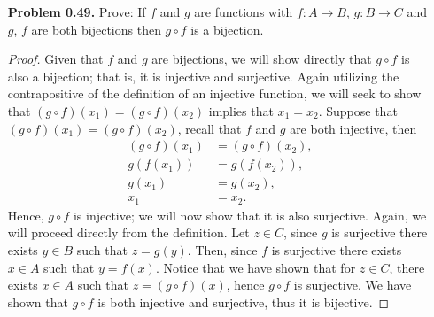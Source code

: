 \documentclass{amsart}
\begin{document}
\begin{enumerate}
		\item[\textbf{Problem 0.49.}] Prove: If $f$ and $g$ are functions with $f: A \to B$, $g: B \to C$ and $g$, $f$ are both bijections then $g \circ f$ is a bijection.
		\begin{proof} Given that $f$ and $g$ are bijections, we will show directly that $g \circ f$ is also a bijection; that is, it is injective and surjective. 
		Again utilizing the contrapositive of the definition of an injective function, we will seek to show that $(g \circ f)(x_{1}) = (g \circ f)(x_{2})$ implies that $x_{1} = x_{2}$. 
		Suppose that $(g \circ f)(x_{1}) = (g \circ f)(x_{2})$, recall that $f$ and $g$ are both injective, then
			\begin{align*}
				(g \circ f)(x_{1}) &= (g \circ f)(x_{2}), \\
				g\left( f(x_{1}) \right) &= g\left( f(x_{2}) \right), \\
				g(x_{1}) &= g(x_{2}), \\
				x_{1} &= x_{2}.
			\end{align*}
		Hence, $g \circ f$ is injective; we will now show that it is also surjective. 
		Again, we will proceed directly from the definition. 
		Let $z \in C$, since $g$ is surjective there exists $y \in B$ such that $z = g(y)$. 
		Then, since $f$ is surjective there exists $x \in A$ such that $y = f(x)$. 
		Notice that we have shown that for $z \in C$, there exists $x \in A$ such that $z = (g \circ f)(x)$, hence $g \circ f$ is surjective. 
		We have shown that $g \circ f$ is both injective and surjective, thus it is bijective.
		\end{proof}


\end{enumerate}
\end{document}

